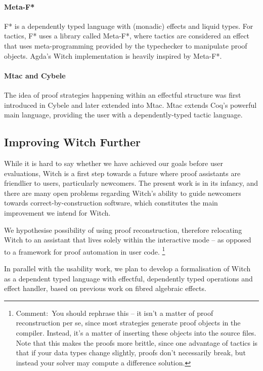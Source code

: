 \documentclass[sigconfl]{acmart}
\newcommand{\comment}[1]{\footnote{Comment:~#1}}
\begin{document}
\paragraph{Meta-F*} F* is a dependently typed language with (monadic) effects and liquid
types. For tactics, F* uses a library called Meta-F*, where tactics are
considered an effect that uses meta-programming provided by the typechecker to
manipulate proof objects. Agda's Witch implementation is heavily inspired by Meta-F*.

\paragraph{Mtac and Cybele} The idea of proof strategies happening within an
effectful structure was first introduced in Cybele and later extended into Mtac.
Mtac extends Coq's powerful main language, providing the user with a
dependently-typed tactic language.

\subsection{Improving Witch Further}
While it is hard to say whether we have achieved our goals before user
evaluations, Witch is a first step towards a future where proof assistants are
friendlier to users, particularly newcomers. The present work is in its
infancy, and there are many open problems regarding Witch's ability to guide newcomers
towards correct-by-construction software, which constitutes the main improvement
we intend for Witch.

We hypothesise possibility of using proof
reconstruction, therefore relocating Witch to an assistant that lives solely
within the interactive mode -- as opposed to a framework for proof
automation in user code.
\comment{You should rephrase this -- it isn't a matter of proof reconstruction
  per se, since most strategies generate proof objects in the compiler. Instead,
it's a matter of inserting these objects into the source files. Note that this
makes the proofs more brittle, since one advantage of tactics is that if your
data types change slightly, proofs don't necessarily break, but instead your
solver may compute a difference solution.}

In parallel with the usability work, we plan to develop a formalisation of Witch
as a dependent typed language with effectful, dependently typed operations and
effect handler, based on previous work on fibred algebraic effects.
\end{document}
